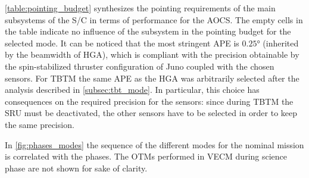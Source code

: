 \autoref{table:pointing_budget} synthesizes the pointing requirements of the main subsystems of the S/C in terms of performance for the AOCS.
The empty cells in the table indicate no influence of the subsystem in the pointing budget for the selected mode.
It can be noticed that the most stringent APE is $0.25$° (inherited by the beamwidth of HGA), which is compliant with the precision obtainable by the spin-stabilized thruster configuration of Juno coupled with the chosen sensors.
For TBTM the same APE as the HGA was arbitrarily selected after the analysis described in \autoref{subsec:tbt_mode}.
In particular, this choice has consequences on the required precision for the sensors: since during TBTM the SRU must be deactivated, the other sensors have to be selected in order to keep the same precision.

In \autoref{fig:phases_modes} the sequence of the different modes for the nominal mission is correlated with the phases.
The OTMs performed in VECM during science phase are not shown for sake of clarity.

